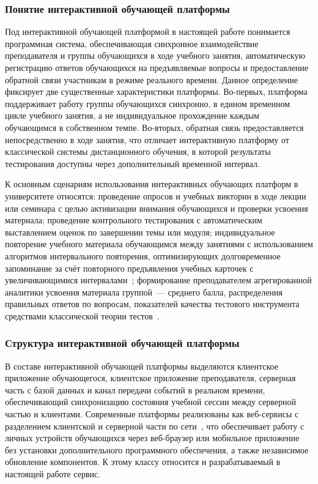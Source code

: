 \subsubsection{Понятие интерактивной обучающей платформы}

Под интерактивной обучающей платформой в настоящей работе понимается
программная система, обеспечивающая синхронное взаимодействие
преподавателя и группы обучающихся в ходе учебного занятия,
автоматическую регистрацию ответов обучающихся на предъявляемые
вопросы и предоставление обратной связи участникам в режиме
реального времени. Данное определение фиксирует две существенные
характеристики платформы. Во-первых, платформа поддерживает
работу группы обучающихся синхронно, в едином временном цикле
учебного занятия, а не индивидуальное прохождение каждым обучающимся
в собственном темпе. Во-вторых, обратная связь предоставляется
непосредственно в ходе занятия, что отличает интерактивную платформу
от классической системы дистанционного обучения, в которой результаты
тестирования доступны через дополнительный временной интервал.

К основным сценариям использования интерактивных обучающих платформ
в университете относятся: проведение опросов и учебных
викторин в ходе лекции или семинара с целью активизации внимания
обучающихся и проверки усвоения материала; проведение контрольного
тестирования с автоматическим выставлением оценок по завершении
темы или модуля; индивидуальное повторение учебного материала
обучающимся между занятиями с использованием алгоритмов
интервального повторения, оптимизирующих долговременное запоминание
за счёт повторного предъявления учебных карточек с увеличивающимися
интервалами~\cite{wozniak1990}; формирование преподавателем
агрегированной аналитики усвоения материала группой~--- среднего
балла, распределения правильных ответов по вопросам, показателей
качества тестового инструмента средствами классической теории
тестов~\cite{cronbach1951,crocker_algina}.

\subsubsection{Структура интерактивной обучающей платформы}

В составе интерактивной обучающей платформы выделяются клиентское
приложение обучающегося, клиентское приложение преподавателя,
серверная часть с базой данных и канал передачи событий в реальном
времени, обеспечивающий синхронизацию состояния учебной сессии
между серверной частью и клиентами. Современные платформы
реализованы как веб-сервисы с разделением клиентской и серверной
части по сети~\cite{rfc9110,rfc6455}, что обеспечивает работу
с личных устройств обучающихся через веб-браузер или мобильное
приложение без установки дополнительного программного обеспечения,
а также независимое обновление компонентов. К этому классу
относится и разрабатываемый в настоящей работе сервис.

